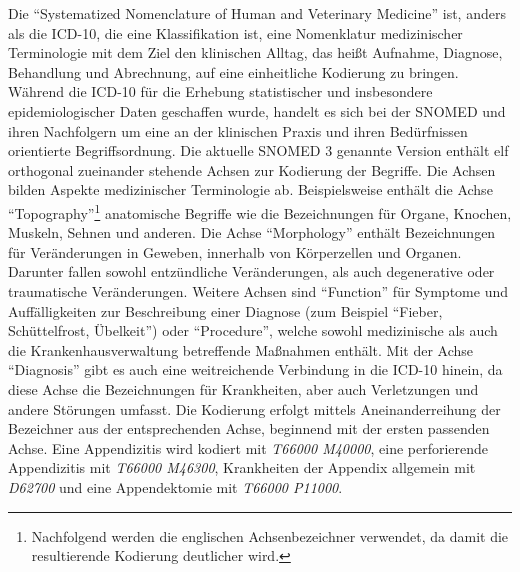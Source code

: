 \documentclass[pagesize,paper=A4,DIV=calc,fontsize=12pt,draft=false]{scrreprt}
\begin{document}
Die \enquote{Systematized Nomenclature of Human and Veterinary Medicine} ist, anders als die ICD-10, die eine Klassifikation ist, eine Nomenklatur medizinischer Terminologie mit dem Ziel den klinischen Alltag, das heißt Aufnahme, Diagnose, Behandlung und Abrechnung, auf eine einheitliche Kodierung zu bringen.
Während die ICD-10 für die Erhebung statistischer und insbesondere epidemiologischer Daten geschaffen wurde, handelt es sich bei der SNOMED und ihren Nachfolgern um eine an der klinischen Praxis und ihren Bedürfnissen orientierte Begriffsordnung.
Die aktuelle SNOMED 3 genannte Version enthält elf orthogonal zueinander stehende Achsen zur Kodierung der Begriffe. 
Die Achsen bilden Aspekte medizinischer Terminologie ab.
Beispielsweise enthält die Achse \enquote{Topography}\footnote{Nachfolgend werden die englischen Achsenbezeichner verwendet, da damit die resultierende Kodierung deutlicher wird.} anatomische Begriffe wie die Bezeichnungen für Organe, Knochen, Muskeln, Sehnen und anderen.
Die Achse \enquote{Morphology} enthält Bezeichnungen für Veränderungen in Geweben, innerhalb von Körperzellen und Organen. 
Darunter fallen sowohl entzündliche Veränderungen, als auch degenerative oder traumatische Veränderungen. 
Weitere Achsen sind \enquote{Function} für Symptome und Auffälligkeiten zur Beschreibung einer Diagnose (zum Beispiel \enquote{Fieber, Schüttelfrost, Übelkeit}) oder \enquote{Procedure}, welche sowohl medizinische als auch die Krankenhausverwaltung betreffende Maßnahmen enthält.
Mit der Achse \enquote{Diagnosis} gibt es auch eine weitreichende Verbindung in die ICD-10 hinein, da diese Achse die Bezeichnungen für Krankheiten, aber auch Verletzungen und andere Störungen umfasst.
Die Kodierung erfolgt mittels Aneinanderreihung der Bezeichner aus der entsprechenden Achse, beginnend mit der ersten passenden Achse. 
Eine Appendizitis wird kodiert mit \emph{T66000 M40000}, eine perforierende Appendizitis mit \emph{T66000 M46300}, Krankheiten der Appendix allgemein mit \emph{D62700} und eine Appendektomie mit \emph{T66000 P11000}.
\end{document}
